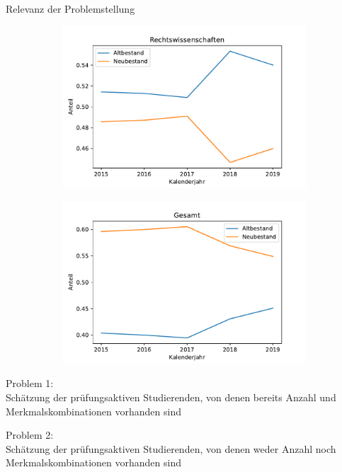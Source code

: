 \documentclass[17pt, fleqn]{beamer}
\begin{document}
\begin{frame}{Relevanz der Problemstellung}
\begin{figure}[ht]
\begin{subfigure}{0.49\textwidth}
            \includegraphics[width = 1\textwidth]{jus2.pdf}
        \end{subfigure}
        \begin{subfigure}{0.49\textwidth}
            
            \includegraphics[width = 1\textwidth]{ges2.pdf}
        \end{subfigure}
            
    \end{figure}
    
\end{frame}

\begin{frame}
    Problem 1: \\
    Schätzung der prüfungsaktiven Studierenden, von denen bereits Anzahl und Merkmalskombinationen vorhanden sind \\[1cm]

    \pause

    Problem 2: \\
    Schätzung der prüfungsaktiven Studierenden, von denen weder Anzahl noch Merkmalskombinationen vorhanden sind    
\end{frame}
\end{document}

